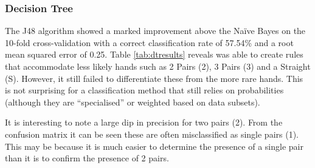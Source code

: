\documentclass[11pt, a4paper]{article}
\begin{document}
\subsubsection*{Decision Tree}

The J48 algorithm showed a marked improvement above the Na\"ive Bayes on the 10-fold cross-validation with a correct classification rate of 57.54\% and a root mean squared error of 0.25. Table \ref{tab:dtresults} reveals was able to create rules that accommodate less likely hands such as 2 Pairs (2), 3 Pairs (3) and a Straight (S). However, it still failed to differentiate these from the more rare hands. This is not surprising for a classification method that still relies on probabilities (although they are ``specialised'' or weighted based on data subsets). 

It is interesting to note a large dip in precision for two pairs (2). From the confusion matrix it can be seen these are often misclassified as single pairs (1). This may be because it is much easier to determine the presence of a single pair than it is to confirm the presence of 2 pairs.
\end{document}
